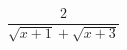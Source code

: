 \hspace*{2mm}\begin{minipage}[t]{\dimexpr\linewidth-2mm\relax}\vspace{0pt}
$\dfrac{2}{\sqrt{x+1}+\sqrt{x+3}}$\end{minipage}
